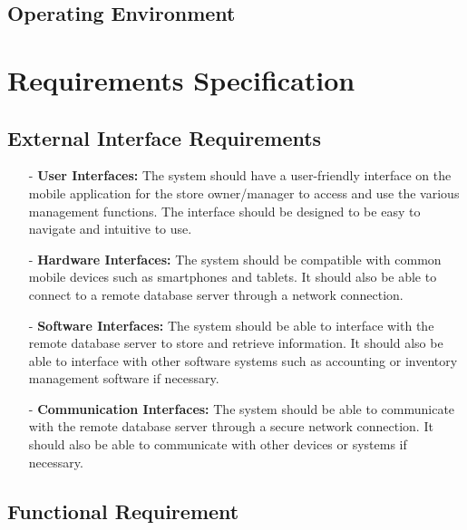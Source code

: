 \documentclass[../thesis.tex]{subfiles}
\begin{document}
\subsection{Operating Environment}
\section{Requirements Specification}
\subsection{External Interface Requirements}
\begin{itemize}
    \item[-]\textbf{User Interfaces:} The system should have a user-friendly interface on the mobile application for the store owner/manager to access and use the various management functions. The interface should be designed to be easy to navigate and intuitive to use.
    \item[-]\textbf{Hardware Interfaces:} The system should be compatible with common mobile devices such as smartphones and tablets. It should also be able to connect to a remote database server through a network connection.
    \item[-]\textbf{Software Interfaces:} The system should be able to interface with the remote database server to store and retrieve information. It should also be able to interface with other software systems such as accounting or inventory management software if necessary.
    \item[-]\textbf{Communication Interfaces:} The system should be able to communicate with the remote database server through a secure network connection. It should also be able to communicate with other devices or systems if necessary.

\end{itemize}

\subsection{Functional Requirement}
\end{document}
